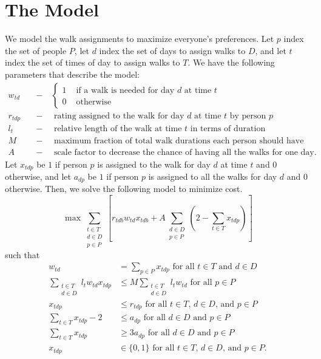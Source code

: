 \documentclass{notes}
\begin{document}
\section*{The Model}
We model the walk assignments to maximize everyone's preferences. Let $p$ index the set of people $P$, let $d$ index the set of days to assign walks to $D$, and let $t$ index the set of times of day to assign walks to $T$. We have the following parameters that describe the model:
\begin{align*}
	w_{td}\quad&-\quad\begin{cases}
		1 & \text{ if a walk is needed for day $d$ at time $t$}\\
		0 & \text{ otherwise}
	\end{cases}\\
	r_{tdp}\quad&-\quad\text{ rating assigned to the walk for day $d$ at time $t$ by person $p$}\\
	l_t\quad&-\quad\text{ relative length of the walk at time $t$ in terms of duration}\\
	M\quad&-\quad\text{ maximum fraction of total walk durations each person should have}\\
	A\quad&-\quad\text{ scale factor to decrease the chance of having all the walks for one day.}
\end{align*}
Let $x_{tdp}$ be $1$ if person $p$ is assigned to the walk for day $d$ at time $t$ and $0$ otherwise, and let $a_{dp}$ be $1$ if person $p$ is assigned to all the walks for day $d$ and $0$ otherwise. Then, we solve the following model to minimize cost.
\[\max\sum_{\substack{t\in T\\ d\in D\\ p\in P}}\left[r_{tdb}w_{td}x_{tdb}+A\sum_{\substack{d\in D\\ p\in P}}\left(2-\sum_{t\in T}x_{tdp}\right)\right]\]
such that
\begin{align}
	w_{td}&=\sum_{p\in P}x_{tdp}\text{ for all $t\in T$ and $d\in D$}\label{constraint1}\\
	\sum_{\substack{t\in T\\ d\in D}}l_tw_{td}x_{tdp}&\leq M\sum_{\substack{t\in T\\ d\in D}}l_tw_{td}\text{ for all $p\in P$}\label{constraint2}\\
	x_{tdp}&\leq r_{tdp}\text{ for all $t\in T$, $d\in D$, and $p\in P$}\label{constraint3}\\
	\sum_{t\in T}x_{tdp}-2&\leq a_{dp}\text{ for all $d\in D$ and $p\in P$}\label{constraint4}\\
	\sum_{t\in T}x_{tdp}&\geq 3a_{dp}\text{ for all $d\in D$ and $p\in P$}\label{constraint5}\\
	x_{tdp}&\in\{0,1\}\text{ for all $t\in T$, $d\in D$, and $p\in P$.}
\end{align}
\end{document}
